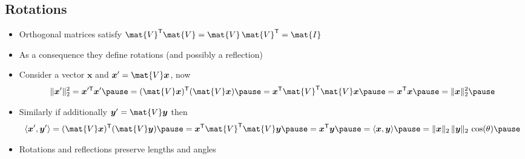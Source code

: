 \begin{slide}
\section[-2]{Rotations}

\begin{PauseHighLight}
  \begin{itemize}
  \item Orthogonal matrices satisfy $\mat{V}^\tr \mat{V} = \mat{V}\,
    \mat{V}^\tr=\mat{I}$\pause
  \item As a consequence they define rotations (and possibly a reflection)\pause
  \item Consider a vector $\bm{x}$ and $\bm{x}'=\mat{V}\bm{x}$, now
    \begin{align*}
      \| \bm{x}' \|_2^2 = \bm{x}^{\prime\tr}\bm{x}'\pause
      = (\mat{V}\bm{x})^\tr (\mat{V}\bm{x})\pause
      = \bm{x}^\tr \mat{V}^\tr \mat{V} \bm{x}\pause
      = \bm{x}^\tr \bm{x} \pause = \| \bm{x} \|_2^2 \pause
    \end{align*}
  \item Similarly if additionally $\bm{y}'=\mat{V}\bm{y}$ then
    {\small
    \begin{align*}
      \langle \bm{x}', \bm{y}' \rangle = (\mat{V}\bm{x})^\tr
      (\mat{V}\bm{y})\pause
       = \bm{x}^\tr \mat{V}^\tr \mat{V} \bm{y}\pause
       = \bm{x}^\tr \bm{y} \pause = \langle \bm{x}, \bm{y} \rangle\pause
       = \| \bm{x} \|_2 \, \| \bm{y} \|_2 \, \cos(\theta)\pause
    \end{align*}}
  \item Rotations and reflections preserve lengths and angles\pause
  \end{itemize}
\end{PauseHighLight}

\end{slide}

\Outline %

